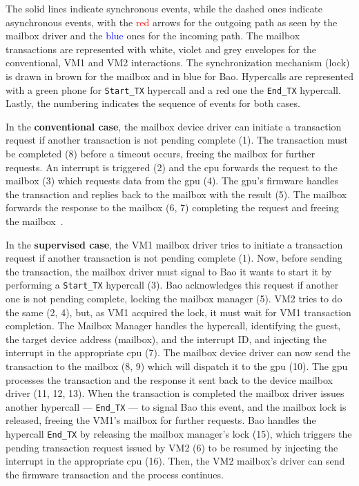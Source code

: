 The solid lines
indicate synchronous events, while the dashed ones
indicate asynchronous events, with the \textcolor{red}{red} arrows for the
outgoing path as seen by the mailbox driver and the \textcolor{blue}{blue} ones for the
incoming path. The mailbox transactions are represented with white, violet and
grey envelopes for the conventional, VM1 and VM2 interactions. The
synchronization mechanism (lock) is drawn in brown for the mailbox and in blue
for Bao. Hypercalls are represented with a green phone for \lstinline{Start_TX}
hypercall and a red one the \lstinline{End_TX} hypercall. Lastly, the numbering
indicates the sequence of events for both cases.

In the \textbf{conventional case}, the mailbox device driver can initiate a transaction
request if another transaction is not pending complete (1). The transaction must
be completed (8) before a timeout occurs, freeing the mailbox for further
requests. An interrupt is triggered (2) and the \gls{cpu} forwards the request
to the mailbox (3) which requests data from the \gls{gpu} (4). The \gls{gpu}'s
firmware handles the transaction and replies back to the mailbox with the
result (5). The mailbox forwards the response to the mailbox (6, 7) completing
the request and freeing the mailbox~\cite{rpi4-mbox-driver}. 

In the \textbf{supervised case}, the VM1 mailbox driver tries to initiate a
transaction request if another transaction is not pending complete (1). Now,
before sending the transaction, the mailbox driver must signal to Bao it wants
to start it by performing a \lstinline{Start_TX} hypercall (3). Bao acknowledges
this request if another one is not pending complete, locking the mailbox manager
(5). VM2 tries to do the same (2, 4), but, as VM1 acquired the lock, it must
wait for VM1 transaction completion. The Mailbox Manager handles the hypercall,
identifying the guest, the target device address (mailbox), and the interrupt
ID, and injecting the interrupt in the appropriate \gls{cpu} (7). The mailbox
device driver can now send the transaction to the mailbox (8, 9) which will
dispatch it to the \gls{gpu} (10). The \gls{gpu} processes the transaction and
the response it sent back to the device mailbox driver (11, 12, 13). When the
transaction is completed the mailbox driver issues another hypercall ---
\lstinline{End_TX} --- to signal Bao this event, and the mailbox lock is released,
freeing the VM1's mailbox for further requests. Bao handles the hypercall
\lstinline{End_TX} by releasing the mailbox manager's lock (15), which triggers
the pending transaction request issued by VM2 (6) to be resumed by injecting the
interrupt in the appropriate \gls{cpu} (16). Then, the VM2 mailbox's driver can
send the firmware transaction and the process continues.

